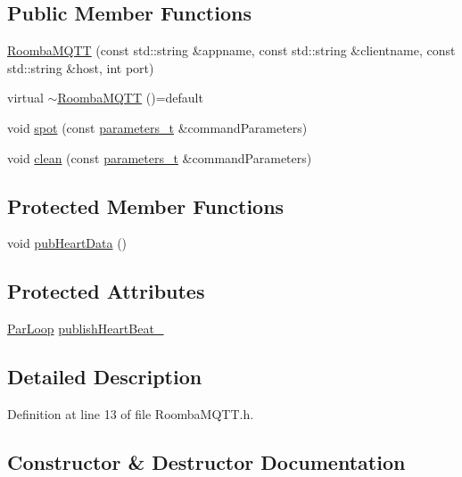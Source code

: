 \subsection*{Public Member Functions}
\begin{DoxyCompactItemize}
\item 
\hyperlink{class_roomba_m_q_t_t_a20d5a60deabb9b8148a3cf0f1409dc71}{Roomba\+M\+Q\+TT} (const std\+::string \&appname, const std\+::string \&clientname, const std\+::string \&host, int port)
\item 
virtual \hyperlink{class_roomba_m_q_t_t_a09e4ed694fcbf4e1f158d0f4eb49683d}{$\sim$\+Roomba\+M\+Q\+TT} ()=default
\item 
void \hyperlink{class_roomba_m_q_t_t_a6f3742feb79a0743c5a79402b9bc9c1f}{spot} (const \hyperlink{_roomba_m_q_t_t_8h_ad3b3bd6544a775cf1e31cd71610c5765}{parameters\+\_\+t} \&command\+Parameters)
\item 
void \hyperlink{class_roomba_m_q_t_t_ae1db76fddfb7c1394bfaed552de1b21d}{clean} (const \hyperlink{_roomba_m_q_t_t_8h_ad3b3bd6544a775cf1e31cd71610c5765}{parameters\+\_\+t} \&command\+Parameters)
\end{DoxyCompactItemize}
\subsection*{Protected Member Functions}
\begin{DoxyCompactItemize}
\item 
void \hyperlink{class_roomba_m_q_t_t_af039bf156519a272d7770831894d0ac8}{pub\+Heart\+Data} ()
\end{DoxyCompactItemize}
\subsection*{Protected Attributes}
\begin{DoxyCompactItemize}
\item 
\hyperlink{class_par_loop}{Par\+Loop} \hyperlink{class_roomba_m_q_t_t_a87013e349743a9ebd7f403adf5a23703}{publish\+Heart\+Beat\+\_\+}
\end{DoxyCompactItemize}


\subsection{Detailed Description}


Definition at line 13 of file Roomba\+M\+Q\+T\+T.\+h.



\subsection{Constructor \& Destructor Documentation}
